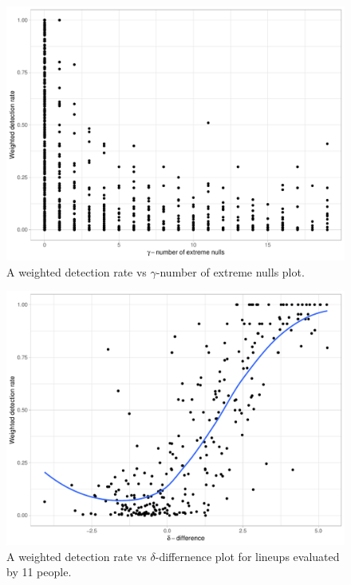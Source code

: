 \documentclass[]{interact}
\theoremstyle{plain}%
\theoremstyle{definition}
\theoremstyle{remark}
\begin{document}
\begin{figure}

{\centering \includegraphics[width=1\linewidth]{paper_files/figure-latex/unnamed-chunk-5-1} 

}

\caption{A weighted detection rate vs $\gamma$-number of extreme nulls plot.}\label{fig:unnamed-chunk-5}
\end{figure}

\begin{figure}

{\centering \includegraphics[width=1\linewidth]{paper_files/figure-latex/unnamed-chunk-6-1} 

}

\caption{A weighted detection rate vs $\delta$-differnence plot for lineups evaluated by 11 people.}\label{fig:unnamed-chunk-6}
\end{figure}
\end{document}
